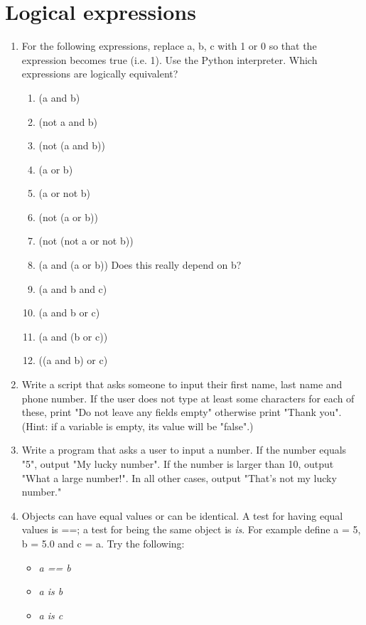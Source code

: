 \documentclass[smallheadings,12pt]{scrartcl}
\begin{document}
\section{Logical expressions}

\begin{enumerate}
\item For the following expressions, replace a, b, c with 1 or 0 so that the expression becomes true (i.e. 1). Use the Python interpreter. Which expressions are logically equivalent? %
\begin{enumerate}
\item (a and b)
\item (not a and b)
\item (not (a and b))
\item (a or b)
\item (a or not b)
\item (not (a or b))
\item (not (not a or not b))
\item (a and (a or b))   Does this really depend on b?
\item (a and b and c)
\item (a and b or c)
\item (a and (b or c))
\item ((a and b) or c)
\end{enumerate}
\item Write a script that asks someone to input their first name, last name and phone number. If the user does not type at least some characters for each of these, print "Do not leave any fields empty" otherwise print "Thank you". (Hint: if a variable is empty, its value will be "false".)
\item Write a program that asks a user to input a number. If the number equals "5", output "My lucky number". If the number is larger than 10, output "What a large number!". In all other cases, output "That's not my lucky number."
\item Objects can have equal values or can be identical. A test for having equal values is ==; a test for being the same object is \textit{is}. For example define a = 5, b = 5.0 and c = a. Try the following:
\begin{itemize}
\item \textit{a == b}
\item \textit{a is b}
\item \textit{a is c}
\end{itemize}

\end{enumerate}
\end{document}
